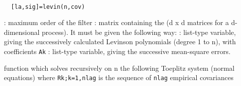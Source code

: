 \begin{mandesc}
   \\
\end{mandesc}
\begin{calling_sequence}
\begin{verbatim}
  [la,sig]=levin(n,cov)  
\end{verbatim}
\end{calling_sequence}
\begin{parameters}
  \begin{varlist}
    : maximum order of the filter
    : matrix containing the
    (d x d matrices for a d-dimensional process). It must be given the following way:
    : list-type variable, giving the successively calculated Levinson polynomials (degree 1 to n), with coefficients \verb!Ak!
    : list-type variable, giving the successive mean-square errors.
  \end{varlist}
\end{parameters}
\begin{mandescription}
  function which solves recursively on n
  the following Toeplitz system (normal equations)
  where {\verb!Rk;k=1,nlag!} is the sequence of \verb!nlag! empirical covariances
\end{mandescription}
